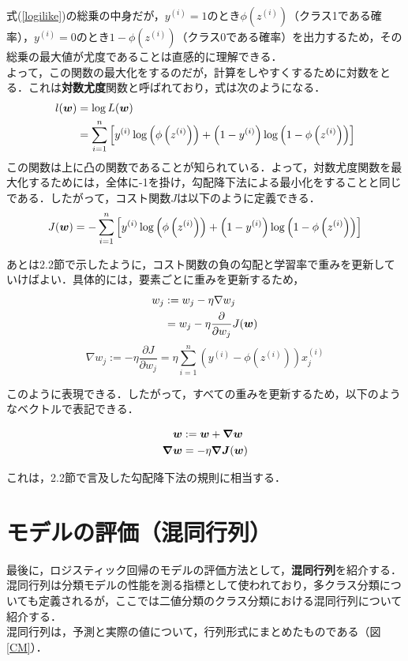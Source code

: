 \documentclass[a4j, 11pt]{jsarticle}
\numberwithin{equation}{section}
\newcommand{\mathbm}[1]{{\mbox{\boldmath $#1$}}}
\begin{document}
\indent 式(\ref{logilike})の総乗の中身だが，$y^{(i)}=1$のとき$\phi(z^{(i)})$（クラス1である確率），$y^{(i)}=0$のとき$1-\phi(z^{(i)})$（クラス0である確率）を出力するため，その総乗の最大値が尤度であることは直感的に理解できる．\\
\indent よって，この関数の最大化をするのだが，計算をしやすくするために対数をとる．これは\textbf{対数尤度}関数と呼ばれており，式は次のようになる．\\
\begin{align}
	l(\mathbm{w}) &= \log L(\mathbm{w})\nonumber\\
					&= \sum_{i=1}^{n}\left[y^{(i)}\log\left(\phi\left(z^{(i)}\right)\right)+\left(1-y^{(i)}\right)\log\left(1-\phi\left(z^{(i)}\right)\right)\right]
	\label{logiloglike}
\end{align}
\indent この関数は上に凸の関数であることが知られている．よって，対数尤度関数を最大化するためには，全体に-1を掛け，勾配降下法による最小化をすることと同じである．したがって，コスト関数$J$は以下のように定義できる．
\begin{equation}
	J(\mathbm{w}) = -\sum_{i=1}^{n}\left[y^{(i)}\log\left(\phi\left(z^{(i)}\right)\right)+\left(1-y^{(i)}\right)\log\left(1-\phi\left(z^{(i)}\right)\right)\right]
\end{equation}

\indent あとは2.2節で示したように，コスト関数の負の勾配と学習率で重みを更新していけばよい．具体的には，要素ごとに重みを更新するため，
\begin{align} 
	w_j &:= w_j-\eta\nabla w_j\\
	     & = w_j-\eta\frac{\partial}{\partial w_j}J(\mathbm{w})
\end{align}
\begin{equation}
	\nabla w_j := -\eta\frac{\partial J}{\partial w_j} = \eta\sum_{i=1}^n\left(y^{(i)}-\phi\left(z^{(i)}\right)\right)x_j^{(i)}
\end{equation}

\indent このように表現できる．したがって，すべての重みを更新するため，以下のようなベクトルで表記できる．

\begin{align} 
	\mathbm{w}&:=\mathbm{w}+\mathbm{\nabla w}\\
	\mathbm{\nabla w} &= -\eta\mathbm{\nabla J}(\mathbm{w})
\end{align}

\indent これは，2.2節で言及した勾配降下法の規則に相当する．

\newpage

\section{モデルの評価（混同行列）}
\indent 最後に，ロジスティック回帰のモデルの評価方法として，\textbf{混同行列}を紹介する．混同行列は分類モデルの性能を測る指標として使われており，多クラス分類についても定義されるが，ここでは二値分類のクラス分類における混同行列について紹介する．\\
\indent 混同行列は，予測と実際の値について，行列形式にまとめたものである（図\ref{CM}）．\\
\end{document}
